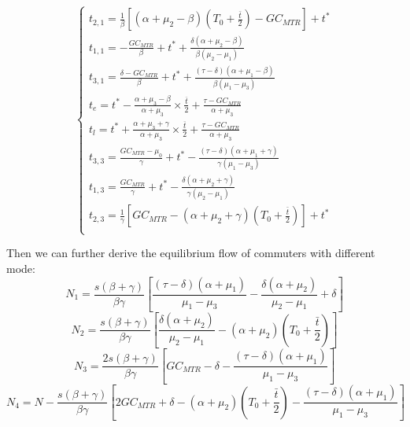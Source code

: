 \documentclass[a4paper,11pt]{article}
\begin{document}
\begin{equation} \label{time point}
    \left\{
    \begin{array}{l}
        t_{2,1}=\frac{1}{\beta}\left[\left(\alpha+\mu_2-\beta\right)\left(T_0+\frac{\bar{t}}{2}\right)-GC_{MTR}\right]+t^* \\
        t_{1,1}=-\frac{GC_{MTR}}{\beta}+t^\ast+\frac{\delta\left(\alpha+\mu_2-\beta\right)}{\beta\left(\mu_2-\mu_1\right)} \\
        t_{3,1}=\frac{\delta-GC_{MTR}}{\beta}+t^\ast+\frac{\left(\tau-\delta\right)\left(\alpha+\mu_1-\beta\right)}{\beta\left(\mu_1-\mu_3\right)} \\
        t_e=t^*-\frac{\alpha+\mu_3-\beta}{\alpha+\mu_3}\times \frac{\overline{t}}{2}+\frac{\tau-GC_{MTR}}{\alpha+\mu_3} \\
        t_l=t^*+\frac{\alpha+\mu_3+\gamma}{\alpha+\mu_3}\times \frac{\overline{t}}{2}+\frac{\tau-GC_{MTR}}{\alpha+\mu_3} \\
        t_{3,3}=\frac{GC_{MTR}-\mu_0}{\gamma}+t^\ast-\frac{\left(\tau-\delta\right)\left(\alpha+\mu_1+\gamma\right)}{\gamma\left(\mu_1-\mu_3\right)} \\
        t_{1,3}=\frac{GC_{MTR}}{\gamma}+t^\ast-\frac{\delta\left(\alpha+\mu_2+\gamma\right)}{\gamma\left(\mu_2-\mu_1\right)} \\
        t_{2,3}=\frac{1}{\gamma}\left[GC_{MTR}-\left(\alpha+\mu_2+\gamma\right)\left(T_0+\frac{\bar{t}}{2}\right)\right]+t^\ast \\
    \end{array}
    \right.
\end{equation}

Then we can further derive the equilibrium flow of commuters with different mode:
\begin{equation}
    N_1=\frac{s\left(\beta+\gamma\right)}{\beta\gamma}\left[\frac{\left(\tau-\delta\right)\left(\alpha+\mu_1\right)}{\mu_1-\mu_3}-\frac{\delta\left(\alpha+\mu_2\right)}{\mu_2-\mu_1}+\delta\right]
    \label{N1}
\end{equation}
\begin{equation}
    N_2=\frac{s\left(\beta+\gamma\right)}{\beta\gamma}\left[\frac{\delta\left(\alpha+\mu_2\right)}{\mu_2-\mu_1}-\left(\alpha+\mu_2\right)\left(T_0+\frac{\bar{t}}{2}\right)\right]
    \label{N2}
\end{equation}
\begin{equation}
    N_3=\frac{2s\left(\beta+\gamma\right)}{\beta\gamma}\left[GC_{MTR}-\delta-\frac{\left(\tau-\delta\right)\left(\alpha+\mu_1\right)}{\mu_1-\mu_3}\right]
    \label{N3}
\end{equation}
\begin{equation}
    N_4=N-\frac{s\left(\beta+\gamma\right)}{\beta\gamma}\left[2GC_{MTR}+\delta-\left(\alpha+\mu_2\right)\left(T_0+\frac{\bar{t}}{2}\right)-\frac{\left(\tau-\delta\right)\left(\alpha+\mu_1\right)}{\mu_1-\mu_3}\right]
    \label{N4}
\end{equation}
\end{document}

